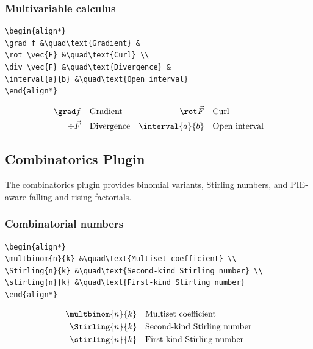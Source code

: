\documentclass{article}
\begin{document}
\subsubsection*{Multivariable calculus}
\begin{verbatim}
\begin{align*}
\grad f &\quad\text{Gradient} &
\rot \vec{F} &\quad\text{Curl} \\
\div \vec{F} &\quad\text{Divergence} &
\interval{a}{b} &\quad\text{Open interval}
\end{align*}
\end{verbatim}
\begin{align*}
\grad f &\quad\text{Gradient} &
\rot \vec{F} &\quad\text{Curl} \\
\div \vec{F} &\quad\text{Divergence} &
\interval{a}{b} &\quad\text{Open interval}
\end{align*}

\subsection{Combinatorics Plugin}

The combinatorics plugin provides binomial variants, Stirling numbers, and PIE-aware falling and rising factorials.

\subsubsection*{Combinatorial numbers}
\begin{verbatim}
\begin{align*}
\multbinom{n}{k} &\quad\text{Multiset coefficient} \\
\Stirling{n}{k} &\quad\text{Second-kind Stirling number} \\
\stirling{n}{k} &\quad\text{First-kind Stirling number}
\end{align*}
\end{verbatim}
\begin{align*}
\multbinom{n}{k} &\quad\text{Multiset coefficient} \\
\Stirling{n}{k} &\quad\text{Second-kind Stirling number} \\
\stirling{n}{k} &\quad\text{First-kind Stirling number}
\end{align*}
\end{document}
